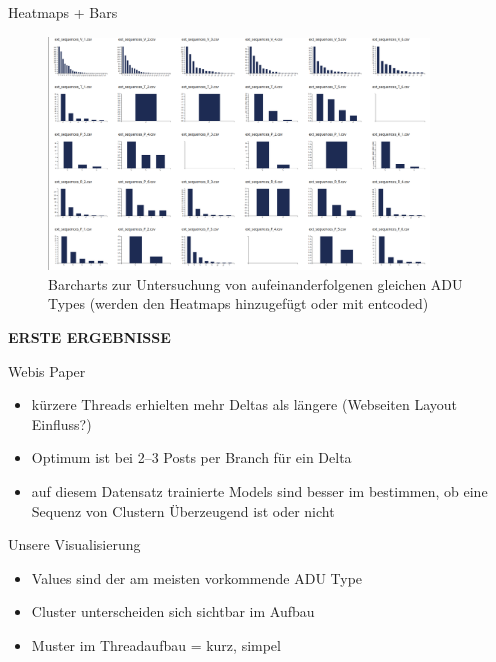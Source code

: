 \documentclass[compress,12pt]{beamer}
\begin{document}
    \begin{frame}{Heatmaps + Bars}
        \begin{figure}
            \centering
            \includegraphics[width=0.9\textwidth]{../images/heatmap-bars-example}
            \caption{Barcharts zur Untersuchung von aufeinanderfolgenen gleichen ADU Types (werden den Heatmaps hinzugefügt oder mit entcoded)}
            \label{fig:heatmap-bars-example}
        \end{figure}
    \end{frame}

    \End

    \begin{frame}
        \centering
        \textbf{ERSTE ERGEBNISSE}
    \end{frame}


    \begin{frame}{Webis Paper}
        \begin{itemize}
            \item kürzere Threads erhielten mehr Deltas als längere (Webseiten Layout Einfluss?)
            \item Optimum ist bei 2--3 Posts per Branch für ein Delta
            \item auf diesem Datensatz trainierte Models sind besser im bestimmen, ob eine Sequenz von Clustern Überzeugend ist oder nicht
        \end{itemize}
    \end{frame}

    \begin{frame}{Unsere Visualisierung}
        \begin{itemize}
            \item Values sind der am meisten vorkommende ADU Type
            \item Cluster unterscheiden sich sichtbar im Aufbau
            \item Muster im Threadaufbau = kurz, simpel
        \end{itemize}
    \end{frame}
    \End
\end{document}
